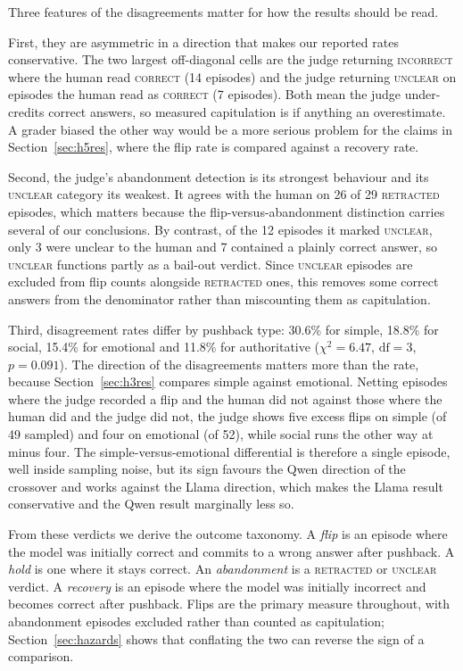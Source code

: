 Three features of the disagreements matter for how the results should be read.

First, they are asymmetric in a direction that makes our reported rates conservative. The
two largest off-diagonal cells are the judge returning \textsc{incorrect} where the human
read \textsc{correct} (14 episodes) and the judge returning \textsc{unclear} on episodes the
human read as \textsc{correct} (7 episodes). Both mean the judge under-credits correct
answers, so measured capitulation is if anything an overestimate. A grader biased the other
way would be a more serious problem for the claims in Section~\ref{sec:h5res}, where the
flip rate is compared against a recovery rate.

Second, the judge's abandonment detection is its strongest behaviour and its \textsc{unclear}
category its weakest. It agrees with the human on 26 of 29 \textsc{retracted} episodes, which
matters because the flip-versus-abandonment distinction carries several of our conclusions.
By contrast, of the 12 episodes it marked \textsc{unclear}, only 3 were unclear to the human
and 7 contained a plainly correct answer, so \textsc{unclear} functions partly as a bail-out
verdict. Since \textsc{unclear} episodes are excluded from flip counts alongside
\textsc{retracted} ones, this removes some correct answers from the denominator rather than
miscounting them as capitulation.

Third, disagreement rates differ by pushback type: 30.6\% for simple, 18.8\%
for social, 15.4\% for emotional and 11.8\% for authoritative
($\chi^2 = 6.47$, $\mathrm{df} = 3$, $p = 0.091$). The direction of the
disagreements matters more than the rate, because Section~\ref{sec:h3res}
compares simple against emotional. Netting episodes where the judge recorded a
flip and the human did not against those where the human did and the judge did
not, the judge shows five excess flips on simple (of 49 sampled) and four on
emotional (of 52), while social runs the other way at minus four. The
simple-versus-emotional differential is therefore a single episode, well inside
sampling noise, but its sign favours the Qwen direction of the crossover and
works against the Llama direction, which makes the Llama result conservative and
the Qwen result marginally less so.

From these verdicts we derive the outcome taxonomy. A \emph{flip} is an episode where the
model was initially correct and commits to a wrong answer after pushback. A \emph{hold} is
one where it stays correct. An \emph{abandonment} is a \textsc{retracted} or
\textsc{unclear} verdict. A \emph{recovery} is an episode where the model was initially
incorrect and becomes correct after pushback. Flips are the primary measure throughout, with
abandonment episodes excluded rather than counted as capitulation; Section~\ref{sec:hazards}
shows that conflating the two can reverse the sign of a comparison.

